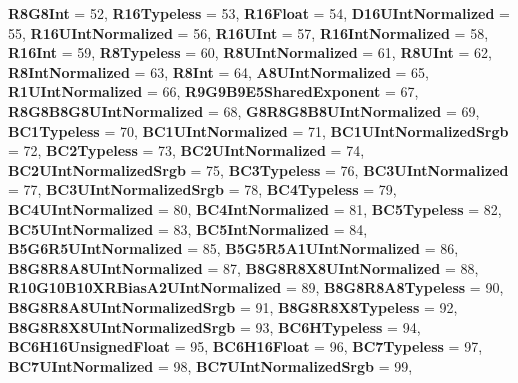 \begin{DoxyCompactItemize}
{\bfseries R8\+G8\+Int} = 52, 
{\bfseries R16\+Typeless} = 53, 
{\bfseries R16\+Float} = 54, 
{\bfseries D16\+U\+Int\+Normalized} = 55, 
\newline
{\bfseries R16\+U\+Int\+Normalized} = 56, 
{\bfseries R16\+U\+Int} = 57, 
{\bfseries R16\+Int\+Normalized} = 58, 
{\bfseries R16\+Int} = 59, 
\newline
{\bfseries R8\+Typeless} = 60, 
{\bfseries R8\+U\+Int\+Normalized} = 61, 
{\bfseries R8\+U\+Int} = 62, 
{\bfseries R8\+Int\+Normalized} = 63, 
\newline
{\bfseries R8\+Int} = 64, 
{\bfseries A8\+U\+Int\+Normalized} = 65, 
{\bfseries R1\+U\+Int\+Normalized} = 66, 
{\bfseries R9\+G9\+B9\+E5\+Shared\+Exponent} = 67, 
\newline
{\bfseries R8\+G8\+B8\+G8\+U\+Int\+Normalized} = 68, 
{\bfseries G8\+R8\+G8\+B8\+U\+Int\+Normalized} = 69, 
{\bfseries B\+C1\+Typeless} = 70, 
{\bfseries B\+C1\+U\+Int\+Normalized} = 71, 
\newline
{\bfseries B\+C1\+U\+Int\+Normalized\+Srgb} = 72, 
{\bfseries B\+C2\+Typeless} = 73, 
{\bfseries B\+C2\+U\+Int\+Normalized} = 74, 
{\bfseries B\+C2\+U\+Int\+Normalized\+Srgb} = 75, 
\newline
{\bfseries B\+C3\+Typeless} = 76, 
{\bfseries B\+C3\+U\+Int\+Normalized} = 77, 
{\bfseries B\+C3\+U\+Int\+Normalized\+Srgb} = 78, 
{\bfseries B\+C4\+Typeless} = 79, 
\newline
{\bfseries B\+C4\+U\+Int\+Normalized} = 80, 
{\bfseries B\+C4\+Int\+Normalized} = 81, 
{\bfseries B\+C5\+Typeless} = 82, 
{\bfseries B\+C5\+U\+Int\+Normalized} = 83, 
\newline
{\bfseries B\+C5\+Int\+Normalized} = 84, 
{\bfseries B5\+G6\+R5\+U\+Int\+Normalized} = 85, 
{\bfseries B5\+G5\+R5\+A1\+U\+Int\+Normalized} = 86, 
{\bfseries B8\+G8\+R8\+A8\+U\+Int\+Normalized} = 87, 
\newline
{\bfseries B8\+G8\+R8\+X8\+U\+Int\+Normalized} = 88, 
{\bfseries R10\+G10\+B10\+X\+R\+Bias\+A2\+U\+Int\+Normalized} = 89, 
{\bfseries B8\+G8\+R8\+A8\+Typeless} = 90, 
{\bfseries B8\+G8\+R8\+A8\+U\+Int\+Normalized\+Srgb} = 91, 
\newline
{\bfseries B8\+G8\+R8\+X8\+Typeless} = 92, 
{\bfseries B8\+G8\+R8\+X8\+U\+Int\+Normalized\+Srgb} = 93, 
{\bfseries B\+C6\+H\+Typeless} = 94, 
{\bfseries B\+C6\+H16\+Unsigned\+Float} = 95, 
\newline
{\bfseries B\+C6\+H16\+Float} = 96, 
{\bfseries B\+C7\+Typeless} = 97, 
{\bfseries B\+C7\+U\+Int\+Normalized} = 98, 
{\bfseries B\+C7\+U\+Int\+Normalized\+Srgb} = 99, 

\end{DoxyCompactItemize}
